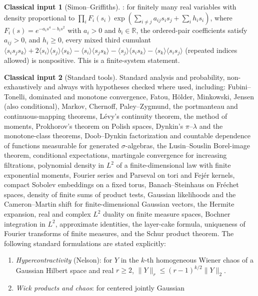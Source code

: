 \documentclass[11pt]{article}
\theoremstyle{plain}
\theoremstyle{definition}
\newtheorem{classical}{Classical input}
\theoremstyle{remark}
\newcommand{\R}{\mathbb{R}}
\begin{document}
\begin{classical}[Simon--Griffiths]\label{prem:C5}
\cite[Thm.~1, p.~148; (4) and Thm.~2, (5), p.~151]{SG1973}: for finitely many real
variables with density proportional to
$\prod_iF_i(s_i)\exp(\sum_{i\ne j}a_{ij}s_is_j+\sum_ih_is_i)$, where
$F_i(s)=e^{-a_is^{4}-b_is^{2}}$ with $a_i>0$ and $b_i\in\R$, the ordered-pair
coefficients satisfy $a_{ij}>0$, and $h_i\ge0$, every mixed third cumulant
$\langle s_is_js_k\rangle+2\langle s_i\rangle\langle s_j\rangle\langle s_k\rangle
-\langle s_i\rangle\langle s_js_k\rangle-\langle s_j\rangle\langle s_is_k\rangle
-\langle s_k\rangle\langle s_is_j\rangle$ (repeated indices allowed) is
nonpositive. This is a finite-system statement.
\end{classical}

\begin{classical}[Standard tools]\label{prem:C6}
Standard analysis and probability, non-exhaustively and always with
hypotheses checked where used, including: Fubini--Tonelli, dominated and
monotone convergence, Fatou, H\"older, Minkowski, Jensen (also conditional),
Markov, Chernoff, Paley--Zygmund, the portmanteau and continuous-mapping
theorems, L\'evy's continuity theorem, the method of moments, Prokhorov's
theorem on Polish spaces, Dynkin's $\pi$--$\lambda$ and the monotone-class
theorems, Doob--Dynkin factorization and countable dependence of functions
measurable for generated $\sigma$-algebras, the Lusin--Souslin Borel-image
theorem, conditional expectations, martingale convergence for increasing
filtrations, polynomial density in $L^{2}$ of a finite-dimensional law with
finite exponential moments, Fourier series and Parseval on tori and Fej\'er
kernels, compact Sobolev embeddings on a fixed torus, Banach--Steinhaus on
Fr\'echet spaces, density of finite sums of product tests, Gaussian likelihoods
and the Cameron--Martin shift for finite-dimensional Gaussian vectors, the
Hermite expansion, real and complex $L^2$ duality on finite measure spaces,
Bochner integration in $L^2$, approximate identities, the layer-cake formula,
uniqueness of Fourier transforms of finite measures, and the Schur product
theorem. The following standard formulations are stated explicitly:
\begin{enumerate}[label=(\alph*)]
\item \emph{Hypercontractivity} (Nelson): for $Y$ in the $k$-th homogeneous Wiener
  chaos of a Gaussian Hilbert space and real $r\ge2$,
  $\|Y\|_{r}\le(r-1)^{k/2}\|Y\|_{2}$.
\item \emph{Wick products and chaos}: for centered jointly Gaussian

\end{enumerate}
\end{classical}
\end{document}
